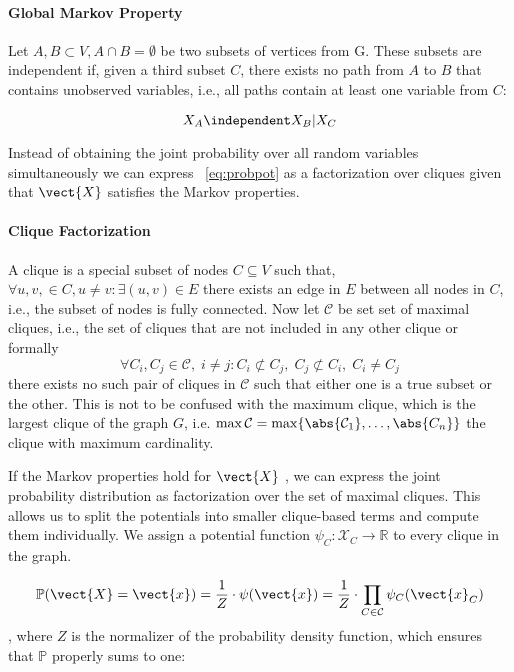 \paragraph*{Global Markov Property}
Let $A, B \subset V, A \cap B = \emptyset$ be two subsets of vertices from G. 
These subsets are independent if, given a third subset $C$, there exists no path from $A$ to $B$ that contains unobserved variables, i.e., all paths contain at least one variable from $C$:

\begin{equation}
    X_A \independent X_B \lvert X_C
\end{equation}

Instead of obtaining the joint probability over all random variables simultaneously we can express \eq~\ref{eq:probpot} as a factorization over cliques given that $\vect{X}$ satisfies the Markov properties. 

\paragraph*{Clique Factorization}

A clique is a special subset of nodes $C \subseteq V$ such that, $\forall u,v,  \in C, u \neq v: \exists (u,v) \in E$ there exists an edge in $E$ between all nodes in $C$, i.e., the subset of nodes is fully connected.
Now let $\mathcal{C}$ be set set of maximal cliques, i.e., the set of cliques that are not included in any other clique or formally 
\begin{equation}
    \forall C_i, C_j \in \mathcal{C},\; i \neq j  : C_i \not\subset C_j,\; C_j \not\subset C_i,\; C_i \neq C_j
\end{equation}
there exists no such pair of cliques in $\mathcal{C}$ such that either one is a true subset or the other.
This is not to be confused with the maximum clique, which is the largest clique of the graph $G$, i.e. $\max \mathcal{C} = \max \{\abs{\mathcal{C}_1}, \ldots, \abs{C_n}\}$ the clique with maximum cardinality.

If the Markov properties hold for $\vect{X}$ , we can express the joint probability distribution as factorization over the set of maximal cliques.
This allows us to split the potentials into smaller clique-based terms and compute them individually. 
We assign a potential function $\psi_C: \mathcal{X}_C \rightarrow \mathbb{R}$ to every clique in the graph.

\begin{equation}
        \mathbb{P}(\vect{X}=\vect{x}) = \frac{1}{Z} \cdot \psi(\vect{x})= \frac{1}{Z} \cdot \prod_{C \in \mathcal{C}} \psi_C(\vect{x}_C)
\end{equation},
where $Z$ is the normalizer of the probability density function, which ensures that $\mathbb{P}$  properly sums to one:

